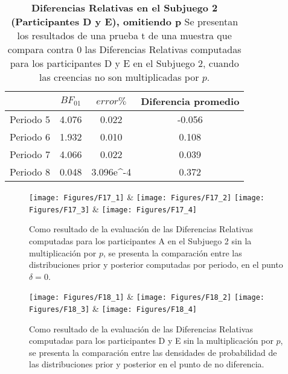 \begin{table}[h]
\caption[Diferencias Relativas en el Subjuego 2, omitiendo la multiplicación por $p$; Participantes D y E (Pruebas t de una muestra)]{\textbf{Diferencias Relativas en el Subjuego 2 (Participantes D y E), omitiendo p} Se presentan los resultados de una prueba t de una muestra que compara contra 0 las Diferencias Relativas computadas para los participantes D y E en el Subjuego 2, cuando las creencias no son multiplicadas por $p$.}
\label{DRnop-S2-DyE-B}
\centering
\begin{tabular}{l | c c | c}
\toprule
\textbf{} & \textbf{$BF_{01}$} & \textbf{$error\%$} & \textbf{Diferencia promedio}\\
\midrule
Periodo 5 & 4.076 & 0.022 & -0.056\\
Periodo 6 & 1.932 & 0.010 & 0.108\\
Periodo 7 & 4.066 & 0.022 & 0.039\\
Periodo 8 & 0.048 & 3.096e^-4 & 0.372\\
\bottomrule
\end{tabular}
\end{table}
  

\begin{figure}[h]
\centering
\texttt{[image: Figures/F17\_1]} & \texttt{[image: Figures/F17\_2]} 
\texttt{[image: Figures/F17\_3]} & \texttt{[image: Figures/F17\_4]} 
\decoRule
\caption[Evaluación de las Diferencias Relativas entre creencias (omitiendo la multiplicación por $p$) y elecciones en los participantes A en el Subjuego 2 (Factor de Bayes)]{Como resultado de la evaluación de las Diferencias Relativas computadas para los participantes A en el Subjuego 2 sin la multiplicación por $p$, se presenta la comparación entre las distribuciones prior y posterior computadas por periodo, en el punto $\delta = 0$.}
\label{fig:DRnop_S2_A}
\end{figure}  


\begin{figure}[h]
\centering
\texttt{[image: Figures/F18\_1]} & \texttt{[image: Figures/F18\_2]} 
\texttt{[image: Figures/F18\_3]} & \texttt{[image: Figures/F18\_4]} 
\decoRule
\caption[Evaluación de las Diferencias Relativas entre creencias (omitiendo la multiplicación por $p$) y elecciones en los participantes D y E en el Subjuego 2 (Factor de Bayes)]{Como resultado de la evaluación de las Diferencias Relativas computadas para los participantes D y E sin la multiplicación  por $p$, se presenta la comparación entre las densidades de probabilidad de las distribuciones prior y posterior en el punto de no diferencia.}
\label{fig:DRnop_S2_DyE}
\end{figure}  

